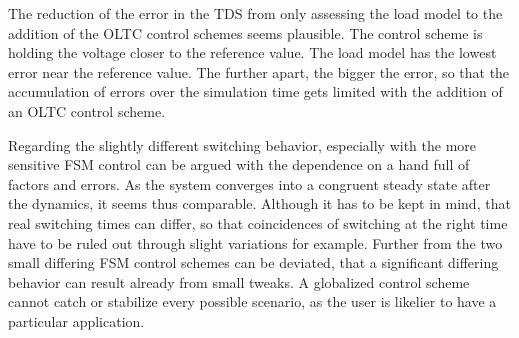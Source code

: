 The reduction of the error in the \acs{TDS} from only assessing the load model to the addition of the \acs{OLTC} control schemes seems plausible.
The control scheme is holding the voltage closer to the reference value. 
The load model has the lowest error near the reference value.
The further apart, the bigger the error, so that the accumulation of errors over the simulation time gets limited with the addition of an \acs{OLTC} control scheme.

Regarding the slightly different switching behavior, especially with the more sensitive \acs{FSM} control can be argued with the dependence on a hand full of factors and errors.
As the system converges into a congruent steady state after the dynamics, it seems thus comparable.
Although it has to be kept in mind, that real switching times can differ, so that coincidences of switching at the right time have to be ruled out through slight variations for example.
Further from the two small differing \acs{FSM} control schemes can be deviated, that a significant differing behavior can result already from small tweaks.
A globalized control scheme cannot catch or stabilize every possible scenario, as the user is likelier to have a particular application.


